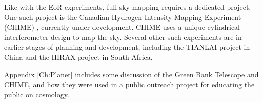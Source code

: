 Like with the EoR experiments, full sky mapping requires a dedicated project. One such project is the Canadian Hydrogen Intensity Mapping Experiment (CHIME) \cite{shaw_2014}\cite{chime}, currently under development. CHIME uses a unique cylindrical interferometer design to map the sky. Several other such experiments are in earlier stages of planning and development, including the TIANLAI project in China and the HIRAX project in South Africa. 

Appendix \ref{Ch:Planet} includes some discussion of the Green Bank Telescope and CHIME, and how they were used in a public outreach project for educating the public on \cm cosmology. 


